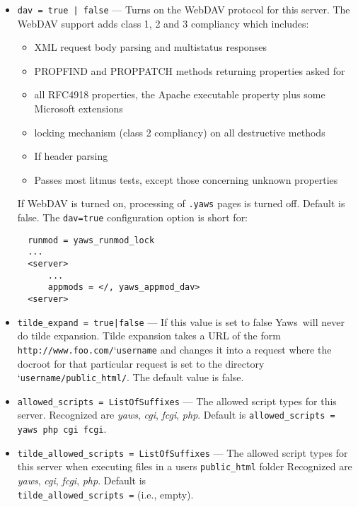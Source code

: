\documentclass[11pt,oneside,english]{book}
\newcommand{\Yaws}            %
        {{\sc Yaws}}
\begin{document}
\begin{itemize}
\item       \verb+dav = true | false+ ---
              Turns on the WebDAV protocol for this server. The WebDAV support adds
              class 1, 2 and 3 compliancy which includes:
              \begin{itemize}
                \item XML request body parsing and  multistatus responses
                \item PROPFIND and PROPPATCH methods returning properties asked for
                \item all RFC4918 properties, the Apache executable property plus
                      some Microsoft extensions
                \item locking mechanism (class 2 compliancy) on all destructive methods
                \item If header parsing
                \item Passes most litmus tests, except those concerning unknown
                      properties
              \end{itemize}
              If WebDAV is turned on, processing of \verb+.yaws+ pages is turned off.
              Default is false. The \verb+dav=true+ configuration option is short for:
\begin{verbatim}
  runmod = yaws_runmod_lock
  ...
  <server>
      ...
      appmods = </, yaws_appmod_dav>
  <server>
\end{verbatim}

\item       \verb+tilde_expand = true|false+ ---
              If  this  value  is  set  to false \Yaws\  will
              never do tilde  expansion.  Tilde expansion takes a URL
              of the form
              \verb+http://www.foo.com/+\char`\~\verb+username+ and
              changes it into a request where the docroot for that
              particular request is set to the directory
              \char`\~\verb+username/public_html/+. The default value
              is false.

\item       \verb+allowed_scripts = ListOfSuffixes+ ---
              The allowed script types for this server.  Recognized are
              \textit{yaws}, \textit{cgi}, \textit{fcgi}, \textit{php}.  Default
              is \verb+allowed_scripts = yaws php cgi fcgi+.

\item       \verb+tilde_allowed_scripts = ListOfSuffixes+ ---
             The allowed script types for this server when executing files in a
             users \verb+public_html+ folder Recognized are \textit{yaws},
             \textit{cgi}, \textit{fcgi}, \textit{php}. Default is\\
             \verb+tilde_allowed_scripts =+ (i.e., empty).


\end{itemize}
\end{document}
